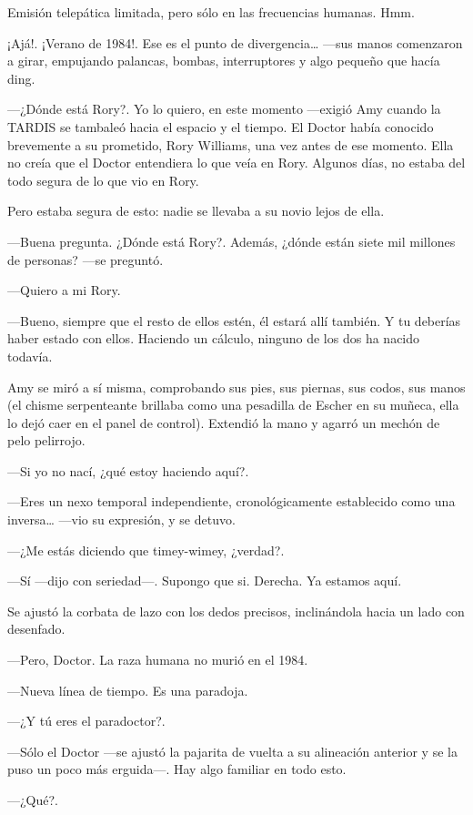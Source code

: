 Emisión telepática limitada, pero sólo en las frecuencias humanas. Hmm.

¡Ajá!. ¡Verano de 1984!. Ese es el punto de divergencia\ldots{} ---sus manos comenzaron a girar, empujando palancas, bombas, interruptores y algo pequeño que hacía ding.

---¿Dónde está Rory?. Yo lo quiero, en este momento ---exigió Amy cuando la TARDIS se tambaleó hacia el espacio y el tiempo. El Doctor había conocido brevemente a su prometido, Rory Williams, una vez antes de ese momento. Ella no creía que el Doctor entendiera lo que veía en Rory. Algunos días, no estaba del todo segura de lo que vio en Rory.

Pero estaba segura de esto: nadie se llevaba a su novio lejos de ella.

---Buena pregunta. ¿Dónde está Rory?. Además, ¿dónde están siete mil millones de personas? ---se preguntó.

---Quiero a mi Rory.

---Bueno, siempre que el resto de ellos estén, él estará allí también. Y tu deberías haber estado con ellos. Haciendo un cálculo, ninguno de los dos ha nacido todavía.

Amy se miró a sí misma, comprobando sus pies, sus piernas, sus codos, sus manos (el chisme serpenteante brillaba como una pesadilla de Escher en su muñeca, ella lo dejó caer en el panel de control). Extendió la mano y agarró un mechón de pelo pelirrojo.

---Si yo no nací, ¿qué estoy haciendo aquí?.

---Eres un nexo temporal independiente, cronológicamente establecido como una inversa\ldots{} ---vio su expresión, y se detuvo.

---¿Me estás diciendo que timey-wimey, ¿verdad?.

---Sí ---dijo con seriedad---. Supongo que si. Derecha. Ya estamos aquí.

Se ajustó la corbata de lazo con los dedos precisos, inclinándola hacia un lado con desenfado.

---Pero, Doctor. La raza humana no murió en el 1984.

---Nueva línea de tiempo. Es una paradoja.

---¿Y tú eres el paradoctor?.

---Sólo el Doctor ---se ajustó la pajarita de vuelta a su alineación anterior y se la puso un poco más erguida---. Hay algo familiar en todo esto.

---¿Qué?.

